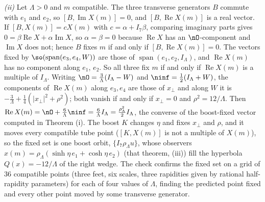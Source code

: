 \emph{(ii)} Let $\Lambda > 0$ and $m$ compatible. The three transverse generators $B$ commute with $e_{1}$ and $e_{2}$, so $[B, \operatorname{Im}X(m)] = 0$, and $[B, \operatorname{Re}X(m)]$ is a real vector. If $[B, X(m)] = cX(m)$ with $c = \alpha + I_{7}\beta$, comparing imaginary parts gives $0 = \beta\operatorname{Re}X + \alpha\operatorname{Im}X$, so $\alpha = \beta = 0$ because $\operatorname{Re}X$ has an $\nO$-component and $\operatorname{Im}X$ does not; hence $B$ fixes $m$ if and only if $[B, \operatorname{Re}X(m)] = 0$. The vectors fixed by $\so(\operatorname{span}(e_{3}, e_{4}, W))$ are those of $\operatorname{span}(e_{1}, e_{2}, I_{\Lambda})$, and $\operatorname{Re}X(m)$ has no component along $e_{1}$, $e_{2}$. So all three fix $m$ if and only if $\operatorname{Re}X(m)$ is a multiple of $I_{\Lambda}$. Writing $\nO = \tfrac{3}{\Lambda}(I_{\Lambda} - W)$ and $\ninf = \tfrac12(I_{\Lambda} + W)$, the components of $\operatorname{Re}X(m)$ along $e_{3}, e_{4}$ are those of $x_{\perp}$ and along $W$ it is $-\tfrac{3}{\Lambda} + \tfrac14(|x_{\perp}|^{2} + \rho^{2})$; both vanish if and only if $x_{\perp} = 0$ and $\rho^{2} = 12/\Lambda$. Then $\operatorname{Re}X(m) = \nO + \tfrac{6}{\Lambda}\ninf = \tfrac{6}{\Lambda}I_{\Lambda} = \tfrac{\rho_{\Lambda}^{2}}{2}I_{\Lambda}$, the converse of the boost-fixed vector computed in Theorem (i). The boost $K$ changes $\eta$ and fixes $x_{\perp}$ and $\rho$, and it moves every compatible tube point ($[K, X(m)]$ is not a multiple of $X(m)$), so the fixed set is one boost orbit, $\{I_{7}\rho_{\Lambda}u\}$, whose observers $x(m) = \rho_{\Lambda}(\sinh\eta\,e_{1} + \cosh\eta\,e_{2})$ (that theorem, (iii)) fill the hyperbola $Q(x) = -12/\Lambda$ of the right wedge. The check confirms the fixed set on a grid of $36$ compatible points (three feet, six scales, three rapidities given by rational half-rapidity parameters) for each of four values of $\Lambda$, finding the predicted point fixed and every other point moved by some transverse generator.

